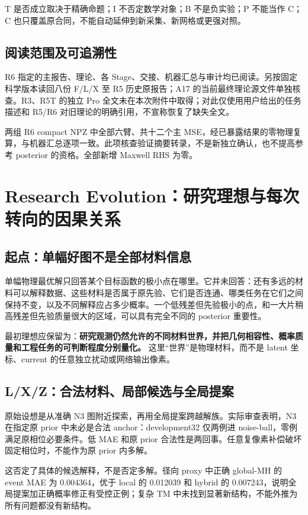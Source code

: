 T 是否成立取决于精确命题；I 不否定数学对象；B 不是负实验；P 不能当作 C；C 也只覆盖原合同，不能自动延伸到新采集、新网格或更强对照。

\subsection{阅读范围及可追溯性}
R6 指定的主报告、理论、各 Stage、交接、机器汇总与审计均已阅读。另按固定科学版本读回八份 F/L/X 至 R5 历史原报告；A17 的当前最终理论源文件单独核查。R3、R5T 的独立 Pro 全文未在本次附件中取得；对此仅使用用户给出的任务描述和 R5/R6 对旧理论的明确引用，不宣称恢复了缺失全文。

两组 R6 compact NPZ 中全部六臂、共十二个主 MSE，经已暴露结果的零物理复算，与机器汇总逐项一致。此项核查验证摘要转录，不是新独立确认，也不提高参考 posterior 的资格。全部新增 Maxwell RHS 为零。

\section{Research Evolution：研究理想与每次转向的因果关系}
\label{sec:evolution}

\subsection{起点：单幅好图不是全部材料信息}
单幅物理最优解只回答某个目标函数的极小点在哪里。它并未回答：还有多远的材料可以解释数据、这些材料是否属于原先验、它们是否连通、哪类任务在它们之间保持不变，以及不同解释应占多少概率。一个低残差但先验极小的点，和一大片稍高残差但先验质量很大的区域，可以具有完全不同的 posterior 重要性。

最初理想应保留为：\textbf{研究观测仍然允许的不同材料世界，并把几何相容性、概率质量和工程任务的可判断程度分别量化。} 这里“世界”是物理材料，而不是 latent 坐标、current 的任意独立扰动或网络输出像素。

\subsection{L/X/Z：合法材料、局部候选与全局提案}
原始设想是从准确 N3 图附近探索，再用全局提案跨越解族。实际审查表明，N3 在指定原 prior 中未必是合法 anchor：development32 仅两例进 noise-ball，零例满足原相位必要条件。低 MAE 和原 prior 合法性是两回事。任意复像素补偿破坏固定相位时，不能作为原 prior 内多解。

这否定了具体的候选解释，不是否定多解。径向 proxy 中正确 global-MH 的 event MAE 为 0.004364，优于 local 的 0.012039 和 hybrid 的 0.007243，说明全局提案加正确概率修正有受控正例；复杂 TM 中未找到显著新结构，不能外推为所有问题都没有新结构。

